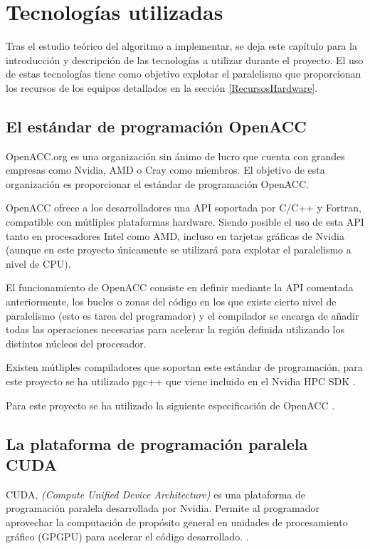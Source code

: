 \chapter{Tecnologías utilizadas}
\label{Tecnologias}
Tras el estudio teórico del algoritmo a implementar, se deja este capítulo para la introducción y descripción de las tecnologías a utilizar durante el proyecto. El uso de estas tecnologías tiene como objetivo explotar el paralelismo que proporcionan los recursos de los equipos detallados en la sección \ref{RecursosHardware}.

\section{El estándar de programación OpenACC}
\label{OpenACC}
OpenACC.org \cite{unknown-author-no-dateB} es una organización sin ánimo de lucro que cuenta con grandes empresas como Nvidia, AMD o Cray como miembros. El objetivo de esta organización es proporcionar el estándar de programación OpenACC.

OpenACC ofrece a los desarrolladores una API soportada por C/C++ y Fortran, compatible con mútliples plataformas hardware. Siendo posible el uso de esta API tanto en procesadores Intel como AMD, incluso en tarjetas gráficas de Nvidia (aunque en este proyecto únicamente se utilizará para explotar el paralelismo a nivel de CPU).

El funcionamiento de OpenACC consiste en definir mediante la API comentada anteriormente, los bucles o zonas del código en los que existe cierto nivel de paralelismo (esto es tarea del programador) y el compilador se encarga de añadir todas las operaciones necesarias para acelerar la región definida utilizando los distintos núcleos del procesador.

Existen mútliples compiladores que soportan este estándar de programación, para este proyecto se ha utilizado pgc++ que viene incluido en el Nvidia HPC SDK \cite{unknown-author-2021D}.

Para este proyecto se ha utilizado la siguiente especificación de OpenACC \cite{unknown-author-2019}.


\section{La plataforma de programación paralela CUDA}
\label{CUDA}

CUDA, \textit{(Compute Unified Device Architecture)} es una plataforma de programación paralela desarrollada por Nvidia. Permite al programador aprovechar la computación de propósito general en unidades de procesamiento gráfico (GPGPU) para acelerar el código desarrollado. \cite{unknown-author-2021E}.

